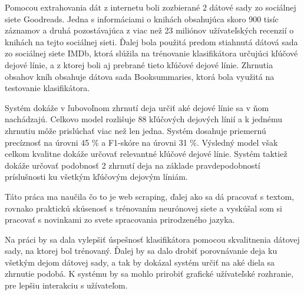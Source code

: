 Pomocou extrahovania dát z internetu boli zozbierané 2 dátové sady zo sociálnej siete Goodreads. Jedna s informáciami o knihách obsahujúca skoro 900 tisíc záznamov a druhá pozostávajúca z viac než 23 miliónov užívateľských recenzií o knihách na tejto sociálnej sieti. Ďalej bola použitá predom stiahnutá dátová sada zo sociálnej siete IMDb, ktorá slúžila na trénovanie klasifikátora určujúci kľúčové dejové línie, a z ktorej boli aj prebrané tieto kľúčové dejové línie. Zhrnutia obsahov kníh obsahuje dátova sada Booksummaries, ktorá bola využitá na testovanie klasifikátora.

Systém dokáže v ľubovoľnom zhrnutí deja určiť aké dejové línie sa v ňom nachádzajú. Celkovo model rozlišuje 88 kľúčových dejových línií a k jednému zhrnutiu môže prislúchať viac než len jedna. Systém dosahuje priemernú precíznosť na úrovni 45 \% a F1-skóre na úrovni 31 \%. Výsledný model však celkom kvalitne dokáže určovať relevantné kľúčové dejové línie. Systém taktiež dokáže určovať podobnosť 2 zhrnutí deja na základe pravdepodobností príslušnosti ku všetkým kľúčovým dejovým líniám.

Táto práca ma naučila  čo to je web scraping, ďalej ako sa dá pracovať s textom, rovnako praktickú skúsenosť s trénovaním neurónovej siete a vyskúšal som si pracovať s novinkami zo svete spracovania prirodzeného jazyka. 

Na práci by sa dala vylepšiť úspešnosť klasifikátora pomocou skvalitnenia dátovej sady, na ktorej bol trénovaný. Ďalej by sa dalo drobiť porovnávanie deja ku všetkým dejom dátovej sady, a tak by dokázal systém určiť na aké diela sa zhrnutie podobá. K systému by sa mohlo prirobiť grafické užívateľské rozhranie, pre lepšiu interakciu s užívateľom.